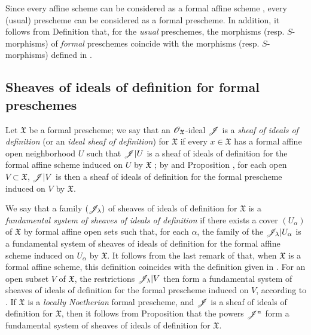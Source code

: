\begin{env}[10.4.8]
\label{I.10.4.8}
Since every affine scheme can be considered as a formal affine scheme , every (usual) prescheme can be considered as a formal prescheme.
In addition, it follows from Definition  that, for the \emph{usual} preschemes, the morphisms (resp. $S$-morphisms) of \emph{formal} preschemes coincide with the morphisms (resp. $S$-morphisms) defined in .
\end{env}

\subsection{Sheaves of ideals of definition for formal preschemes}
\label{subsection:I.10.5}

\begin{env}[10.5.1]
\label{I.10.5.1}
Let $\mathfrak{X}$ be a formal prescheme; we say that an $\mathscr{O}_\mathfrak{X}$-ideal $\mathscr{J}$ is a \emph{sheaf of ideals of definition} (or an \emph{ideal sheaf of definition}) for $\mathfrak{X}$ if every $x\in\mathfrak{X}$ has a formal affine open neighborhood $U$ such that $\mathscr{J}|U$ is a sheaf of ideals of definition for the formal affine scheme induced on $U$ by $\mathfrak{X}$ ; by  and Proposition , for each open $V\subset\mathfrak{X}$, $\mathscr{J}|V$ is then a sheaf of ideals of definition for the formal prescheme induced on $V$ by $\mathfrak{X}$.

We say that a family $(\mathscr{J}_\lambda)$ of sheaves of ideals of definition for $\mathfrak{X}$ is a \emph{fundamental system}
\emph{of sheaves of ideals of definition} if there exists a cover $(U_\alpha)$ of $\mathfrak{X}$ by formal affine open sets such that, for each $\alpha$, the family of the $\mathscr{J}_\lambda|U_\alpha$ is a fundamental system of sheaves of ideals of definition  for the formal affine scheme induced on $U_\alpha$ by $\mathfrak{X}$.
It follows from the last remark of  that, when $\mathfrak{X}$ is a formal affine scheme, this definition coincides with the definition given in .
For an open subset $V$ of $\mathfrak{X}$, the restrictions $\mathscr{J}_\lambda|V$ then form a fundamental system of sheaves of ideals of definition for the formal prescheme induced on $V$, according to .
If $\mathfrak{X}$ is a \emph{locally Noetherian} formal prescheme, and $\mathscr{J}$ is a sheaf of ideals of definition for $\mathfrak{X}$, then it follows from Proposition  that the powers $\mathscr{J}^n$ form a fundamental system of sheaves of ideals of definition for $\mathfrak{X}$.
\end{env}

